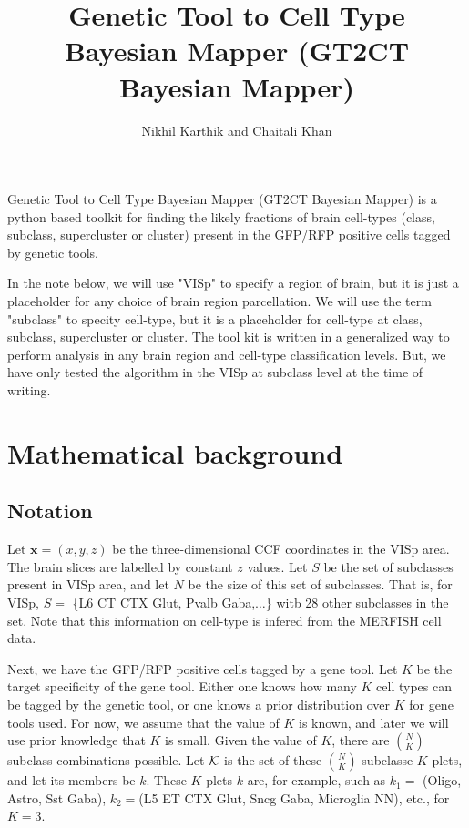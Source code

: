 \documentclass{article}
\title{Genetic Tool to Cell Type Bayesian Mapper (GT2CT Bayesian Mapper)}
\author{Nikhil Karthik and Chaitali Khan}
\begin{document}
\maketitle

Genetic Tool to Cell Type Bayesian Mapper (GT2CT Bayesian Mapper) is a python based toolkit for 
finding the likely fractions of brain cell-types (class, subclass, supercluster or cluster)
present in the GFP/RFP positive cells tagged by genetic tools.

In the note below, we will use "VISp" to specify a region of brain, but it is just a placeholder for any 
choice of brain region parcellation.
We will use the term "subclass" to specity cell-type, but it is a placeholder for
cell-type at class, subclass, supercluster or cluster. The tool kit is written in a generalized way 
to perform analysis in any brain region and cell-type classification levels. But, we 
have only tested the algorithm in the VISp at subclass level at the time of writing.

\section{Mathematical background}

\subsection{Notation}

Let $\mathbf{x}=(x, y, z)$ be the three-dimensional CCF coordinates in the VISp area.  The brain slices 
are labelled by constant $z$ values.  Let $S$ be the set of subclasses present in VISp area, and let 
$N$ be the size of this set of subclasses. That is, for VISp, $S =$ \{L6 CT CTX Glut, Pvalb Gaba,$\ldots$\} 
witb 28 other subclasses in the set. Note that this information on cell-type is infered from the MERFISH cell data.

Next, we have the GFP/RFP positive cells tagged by a gene tool. 
Let $K$ be the target specificity of the gene tool. Either one knows
how many $K$ cell types can be tagged by the genetic tool, or one
knows a prior distribution over $K$ for gene tools used. For now,
we assume that the value of $K$ is known, and later we will use
prior knowledge that $K$ is small. Given the value of $K$, there
are $\binom{N}{K}$ subclass combinations possible.
Let ${\cal K}$ is the set of these $\binom{N}{K}$ subclasse $K$-plets, and
let its members be $k$. These $K$-plets $k$ are, for example,
such as $k_1 =$ (Oligo, Astro, Sst Gaba), $k_2=$(L5 ET CTX Glut, Sncg Gaba, Microglia NN), etc., for 
$K=3$.
\end{document}
